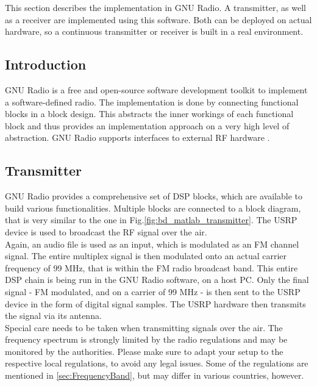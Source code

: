 This section describes the implementation in GNU Radio.
A transmitter, as well as a receiver are implemented using this software.
Both can be deployed on actual hardware, so a continuous transmitter or receiver is built in a real environment.

\subsection{Introduction}

GNU Radio is a free and open-source software development toolkit to implement a software-defined radio.
The implementation is done by connecting functional blocks in a block design.
This abstracts the inner workings of each functional block and thus provides an implementation approach on a very high level of abstraction.
GNU Radio supports interfaces to external RF hardware \cite{SoftwareGnuRadio}.

\subsection{Transmitter}

GNU Radio provides a comprehensive set of DSP blocks, which are available to build various functionalities.
Multiple blocks are connected to a block diagram, that is very similar to the one in Fig.\ref{fig:bd_matlab_transmitter}.
The USRP device is used to broadcast the RF signal over the air.\\

Again, an audio file is used as an input, which is modulated as an FM channel signal.
The entire multiplex signal is then modulated onto an actual carrier frequency of 99 MHz, that is within the FM radio broadcast band.
This entire DSP chain is being run in the GNU Radio software, on a host PC.
Only the final signal - FM modulated, and on a carrier of 99 MHz - is then sent to the USRP device in the form of digital signal samples.
The USRP hardware then transmits the signal via its antenna.\\

Special care needs to be taken when transmitting signals over the air.
The frequency spectrum is strongly limited by the radio regulations and may be monitored by the authorities.
Please make sure to adapt your setup to the respective local regulations, to avoid any legal issues.
Some of the regulations are mentioned in \ref{sec:FrequencyBand}, but may differ in various countries, however.\\

